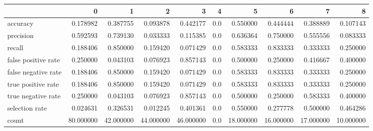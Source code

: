 \begin{tabular}{lrrrrrrrrr}
\toprule
{} &          0 &          1 &          2 &          3 &    4 &          5 &          6 &          7 &          8 \\
\midrule
accuracy            &   0.178982 &   0.387755 &   0.093878 &   0.442177 &  0.0 &   0.550000 &   0.444444 &   0.388889 &   0.107143 \\
precision           &   0.592593 &   0.739130 &   0.033333 &   0.115385 &  0.0 &   0.636364 &   0.750000 &   0.555556 &   0.083333 \\
recall              &   0.188406 &   0.850000 &   0.159420 &   0.071429 &  0.0 &   0.583333 &   0.833333 &   0.333333 &   0.250000 \\
false positive rate &   0.250000 &   0.043103 &   0.076923 &   0.857143 &  0.0 &   0.500000 &   0.250000 &   0.416667 &   0.400000 \\
false negative rate &   0.188406 &   0.850000 &   0.159420 &   0.071429 &  0.0 &   0.583333 &   0.833333 &   0.333333 &   0.250000 \\
true positive rate  &   0.188406 &   0.850000 &   0.159420 &   0.071429 &  0.0 &   0.583333 &   0.833333 &   0.333333 &   0.250000 \\
true negative rate  &   0.250000 &   0.043103 &   0.076923 &   0.857143 &  0.0 &   0.500000 &   0.250000 &   0.583333 &   0.400000 \\
selection rate      &   0.024631 &   0.326531 &   0.012245 &   0.401361 &  0.0 &   0.550000 &   0.277778 &   0.500000 &   0.464286 \\
count               &  80.000000 &  42.000000 &  44.000000 &  46.000000 &  0.0 &  18.000000 &  16.000000 &  17.000000 &  10.000000 \\
\bottomrule
\end{tabular}
